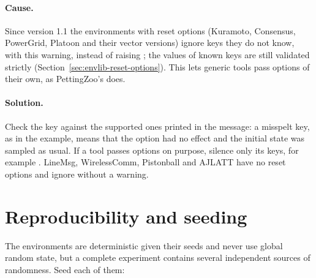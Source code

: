 \paragraph{Cause.} Since version 1.1 the environments with reset options
(Kuramoto, Consensus, PowerGrid, Platoon and their vector versions) ignore keys
they do not know, with this warning, instead of raising ; the
values of known keys are still validated strictly
(Section~\ref{sec:envlib-reset-options}). This lets generic tools pass options
of their own, as PettingZoo's  does.

\paragraph{Solution.} Check the key against the supported ones printed in the
message: a misspelt key, as in the example, means that the option had no effect
and the initial state was sampled as usual. If a tool passes options on
purpose, silence only its keys, for example
. LineMsg, WirelessComm, Pistonball and AJLATT have no
reset options and ignore  without a warning.

\section{Reproducibility and seeding}\label{sec:trouble-seeding}

The environments are deterministic given their seeds and never use global
random state, but a complete experiment contains several independent sources
of randomness. Seed each of them:

